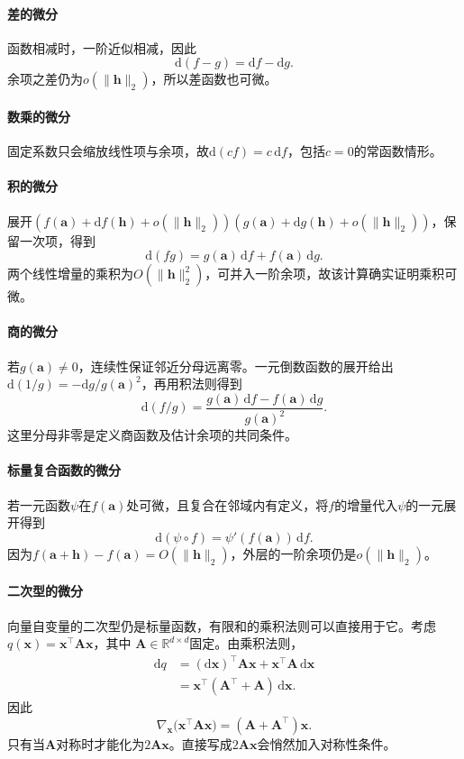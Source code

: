\paragraph{差的微分}
函数相减时，一阶近似相减，因此
\[
 \mathrm d(f-g)=\mathrm df-\mathrm dg.
\]
余项之差仍为$o(\lVert\bm h\rVert_2)$，所以差函数也可微。

\paragraph{数乘的微分}
固定系数只会缩放线性项与余项，故$\mathrm d(cf)=c\,\mathrm df$，包括$c=0$的常函数情形。

\paragraph{积的微分}
展开$(f(\bm a)+\mathrm df(\bm h)+o(\lVert\bm h\rVert_2))(g(\bm a)+\mathrm dg(\bm h)+o(\lVert\bm h\rVert_2))$，保留一次项，得到
\[
 \mathrm d(fg)=g(\bm a)\,\mathrm df+f(\bm a)\,\mathrm dg.
\]
两个线性增量的乘积为$O(\lVert\bm h\rVert_2^2)$，可并入一阶余项，故该计算确实证明乘积可微。

\paragraph{商的微分}
若$g(\bm a)\neq0$，连续性保证邻近分母远离零。一元倒数函数的展开给出$\mathrm d(1/g)=-\mathrm dg/g(\bm a)^2$，再用积法则得到
\[
 \mathrm d(f/g)=\frac{g(\bm a)\,\mathrm df-f(\bm a)\,\mathrm dg}{g(\bm a)^2}.
\]
这里分母非零是定义商函数及估计余项的共同条件。

\paragraph{标量复合函数的微分}
若一元函数$\psi$在$f(\bm a)$处可微，且复合在邻域内有定义，将$f$的增量代入$\psi$的一元展开得到
\[
 \mathrm d(\psi\circ f)=\psi'(f(\bm a))\,\mathrm df.
\]
因为$f(\bm a+\bm h)-f(\bm a)=O(\lVert\bm h\rVert_2)$，外层的一阶余项仍是$o(\lVert\bm h\rVert_2)$。

\paragraph{二次型的微分}
向量自变量的二次型仍是标量函数，有限和的乘积法则可以直接用于它。考虑$q(\bm{x})=\bm{x}^{\top}\bm{A}\bm{x}$，其中 $\bm{A}\in\mathbb{R}^{d\times d}$固定。由乘积法则，
\begin{align*}
  \mathrm{d}q
  &=
  (\mathrm{d}\bm{x})^{\top}\bm{A}\bm{x}
  +\bm{x}^{\top}\bm{A}\,\mathrm{d}\bm{x}\\
  &=
  \bm{x}^{\top}(\bm{A}^{\top}+\bm{A})\,\mathrm{d}\bm{x}.
\end{align*}
因此
\begin{equation}
  \nabla_{\bm{x}}
  \bigl(\bm{x}^{\top}\bm{A}\bm{x}\bigr)
  =
  (\bm{A}+\bm{A}^{\top})\bm{x}.
\label{eq:analysis-quadratic-form-gradient}
\end{equation}
只有当$\bm{A}$对称时才能化为$2\bm{A}\bm{x}$。直接写成$2\bm{A}\bm{x}$会悄然加入对称性条件。


